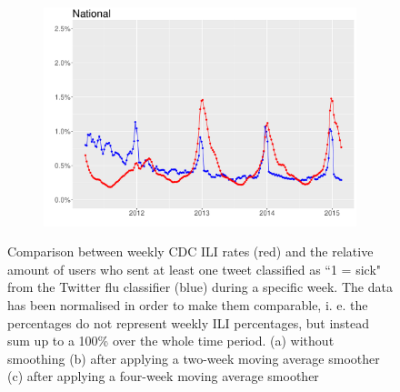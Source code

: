 \documentclass[11pt, a4paper]{report}\usepackage[]{graphicx}\usepackage[]{color}
\begin{document}
\begin{figure}[H]
  \begin{subfigure}[t]{0.6\textwidth}
  \includegraphics[width=1\linewidth,height=0.5\linewidth]{cdc_twitter_comp_nat_ma4_user.pdf}
  \caption{}
  \end{subfigure}
  \caption{Comparison between weekly CDC ILI rates (red) and the relative amount of users who sent at least one tweet classified as ``1 = sick" from the Twitter flu classifier (blue) during a specific week. The data has been normalised in order to make them comparable, i. e. the percentages do not represent weekly ILI percentages, but instead sum up to a 100\% over the whole time period. (a) without smoothing (b) after applying a two-week moving average smoother (c) after applying a four-week moving average smoother}
  \label{fig:cdc_tw_comp_nat_user}
\end{figure}
\end{document}
